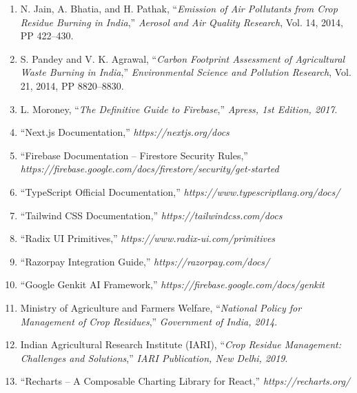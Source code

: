 \documentclass[a4paper,12pt,oneside]{report}
\let\originalitem\item
\renewcommand{\item}{\Needspace{10\baselineskip}\originalitem}
\begin{document}
\begin{enumerate}
    \item[{[1]}] N. Jain, A. Bhatia, and H. Pathak, ``\textit{Emission of Air Pollutants from Crop Residue Burning in India},'' \textit{Aerosol and Air Quality Research}, Vol. 14, 2014, PP 422--430.

    \item[{[2]}] S. Pandey and V. K. Agrawal, ``\textit{Carbon Footprint Assessment of Agricultural Waste Burning in India},'' \textit{Environmental Science and Pollution Research}, Vol. 21, 2014, PP 8820--8830.

    \item[{[3]}] L. Moroney, ``\textit{The Definitive Guide to Firebase},'' \textit{Apress, 1st Edition, 2017}.

    \item[{[4]}] ``Next.js Documentation,'' \textit{https://nextjs.org/docs}

    \item[{[5]}] ``Firebase Documentation -- Firestore Security Rules,'' \textit{https://firebase.google.com/docs/firestore/security/get-started}

    \item[{[6]}] ``TypeScript Official Documentation,'' \textit{https://www.typescriptlang.org/docs/}

    \item[{[7]}] ``Tailwind CSS Documentation,'' \textit{https://tailwindcss.com/docs}

    \item[{[8]}] ``Radix UI Primitives,'' \textit{https://www.radix-ui.com/primitives}

    \item[{[9]}] ``Razorpay Integration Guide,'' \textit{https://razorpay.com/docs/}

    \item[{[10]}] ``Google Genkit AI Framework,'' \textit{https://firebase.google.com/docs/genkit}

    \item[{[11]}] Ministry of Agriculture and Farmers Welfare, ``\textit{National Policy for Management of Crop Residues},'' \textit{Government of India, 2014}.

    \item[{[12]}] Indian Agricultural Research Institute (IARI), ``\textit{Crop Residue Management: Challenges and Solutions},'' \textit{IARI Publication, New Delhi, 2019}.

    \item[{[13]}] ``Recharts -- A Composable Charting Library for React,'' \textit{https://recharts.org/}


\end{enumerate}
\end{document}
